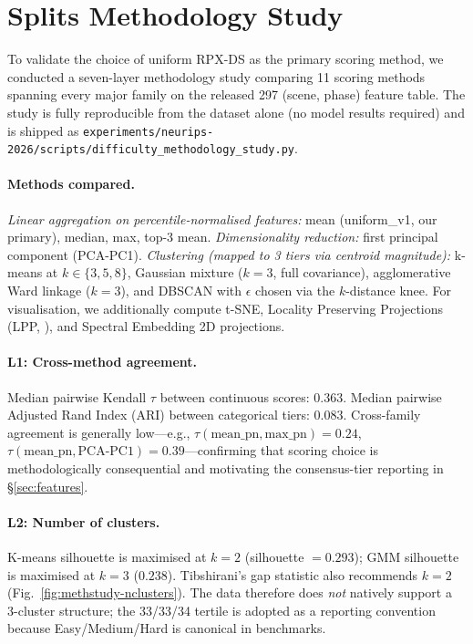 \section{Splits Methodology Study}
\label{sec:appendix-method-study}

To validate the choice of uniform RPX-DS as the primary scoring method, we conducted a seven-layer methodology study comparing 11 scoring methods spanning every major family on the released 297 (scene, phase) feature table.
The study is fully reproducible from the dataset alone (no model results required) and is shipped as \texttt{experiments/neurips-2026/scripts/difficulty\_methodology\_study.py}.

\paragraph{Methods compared.}
\textit{Linear aggregation on percentile-normalised features:} mean (uniform\_v1, our primary), median, max, top-3 mean.
\textit{Dimensionality reduction:} first principal component (PCA-PC1).
\textit{Clustering (mapped to 3 tiers via centroid magnitude):} k-means at $k\in\{3,5,8\}$, Gaussian mixture ($k=3$, full covariance), agglomerative Ward linkage ($k=3$), and DBSCAN with $\epsilon$ chosen via the $k$-distance knee.
For visualisation, we additionally compute t-SNE, Locality Preserving Projections (LPP, \citet{he2003lpp}), and Spectral Embedding 2D projections.

\paragraph{L1: Cross-method agreement.}
Median pairwise Kendall $\tau$ between continuous scores: $0.363$.
Median pairwise Adjusted Rand Index (ARI) between categorical tiers: $0.083$.
Cross-family agreement is generally low---e.g., $\tau(\text{mean\_pn}, \text{max\_pn}) = 0.24$, $\tau(\text{mean\_pn}, \text{PCA-PC1}) = 0.39$---confirming that scoring choice is methodologically consequential and motivating the consensus-tier reporting in \S\ref{sec:features}.

\paragraph{L2: Number of clusters.}
K-means silhouette is maximised at $k=2$ (silhouette $= 0.293$); GMM silhouette is maximised at $k=3$ ($0.238$). Tibshirani's gap statistic also recommends $k=2$ (Fig.~\ref{fig:methstudy-nclusters}).
The data therefore does \textit{not} natively support a 3-cluster structure; the 33/33/34 tertile is adopted as a reporting convention because Easy/Medium/Hard is canonical in benchmarks.

